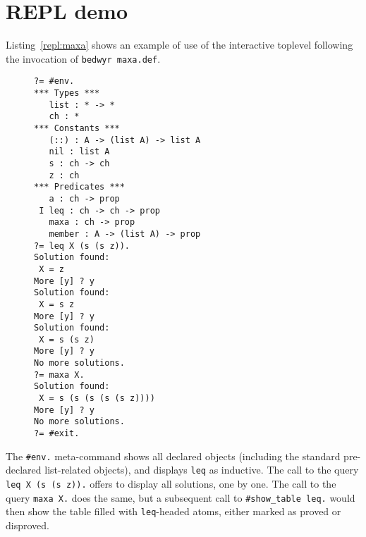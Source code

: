 \documentclass[a4paper]{article} %
\begin{document}
\section{REPL demo}

Listing~\ref{repl:maxa} shows an example of use of the interactive toplevel
following the invocation of \verb+bedwyr maxa.def+.

\begin{figure}[h]
\begin{lstlisting}[style=bedwyr-repl,caption={Interactive session},label=repl:maxa]
?= #env.
*** Types ***
   list : * -> *
   ch : *
*** Constants ***
   (::) : A -> (list A) -> list A
   nil : list A
   s : ch -> ch
   z : ch
*** Predicates ***
   a : ch -> prop
 I leq : ch -> ch -> prop
   maxa : ch -> prop
   member : A -> (list A) -> prop
?= leq X (s (s z)).
Solution found:
 X = z
More [y] ? y
Solution found:
 X = s z
More [y] ? y
Solution found:
 X = s (s z)
More [y] ? y
No more solutions.
?= maxa X.
Solution found:
 X = s (s (s (s (s z))))
More [y] ? y
No more solutions.
?= #exit.
\end{lstlisting}
\end{figure}

The \lstinline+#env.+ meta-command shows all declared objects
(including the standard pre-declared list-related objects),
and displays \lstinline+leq+ as inductive.
The call to the query \lstinline+leq X (s (s z)).+ offers to display all
solutions, one by one.
The call to the query \lstinline+maxa X.+ does the same,
but a subsequent call to \lstinline+#show_table leq.+ would then show the table
filled with \lstinline+leq+-headed atoms, either marked as proved or disproved.
\end{document}
